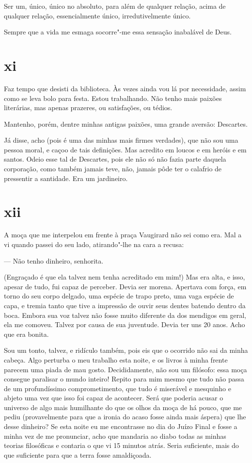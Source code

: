 Ser um, único, único no absoluto, para além de qualquer relação, acima
de qualquer relação, essencialmente único, irredutivelmente único.

Sempre que a vida me esmaga socorre"-me essa sensação inabalável de Deus.

\section{xi}

Faz tempo que desisti da biblioteca. Às vezes ainda vou lá por
necessidade, assim como se leva bolo para festa. Estou trabalhando. Não
tenho mais paixões literárias, mas apenas prazeres, ou satisfações, ou
tédios.

Mantenho, porém, dentre minhas antigas paixões, uma grande aversão:
Descartes.

Já disse, acho (pois é uma das minhas mais firmes verdades), que não
sou uma pessoa moral, e caçoo de tais definições. Mas acredito em loucos
e em heróis e em santos. Odeio esse tal de Descartes, pois ele não só
não fazia parte daquela corporação, como também jamais teve, não, jamais
pôde ter o calafrio de pressentir a santidade. Era um jardineiro.

\section{xii}

A moça que me interpelou em frente à praça Vaugirard não sei como era.
Mal a vi quando passei do seu lado, atirando"-lhe na cara a recusa:

--- Não tenho dinheiro, senhorita.

(Engraçado é que ela talvez nem tenha acreditado em mim!) Mas era alta,
e isso, apesar de tudo, fui capaz de perceber. Devia ser morena.
Apertava com força, em torno do seu corpo delgado, uma espécie de trapo
preto, uma vaga espécie de capa, e tremia tanto que tive a impressão de
ouvir seus dentes batendo dentro da boca. Embora sua voz talvez não
fosse muito diferente da dos mendigos em geral, ela me comoveu. Talvez
por causa de sua juventude. Devia ter uns 20 anos. Acho que era bonita.

Sou um tonto, talvez, e ridículo também, pois eis que o ocorrido não sai
da minha cabeça. Algo perturba o meu trabalho esta noite, e os livros à
minha frente parecem uma piada de mau gosto. Decididamente, não sou um
filósofo: essa moça consegue paralisar o mundo inteiro! Repito para mim
mesmo que tudo não passa de um profundíssimo comprometimento, que tudo é
miserável e mesquinho e abjeto uma vez que isso foi capaz de acontecer.
Será que poderia acusar o universo de algo mais humilhante do que os
olhos da moça de há pouco, que me pediu (provavelmente para que a ironia
do acaso fosse ainda mais áspera) que lhe desse dinheiro? Se esta
noite eu me encontrasse no dia do Juízo Final e fosse a minha vez de me
pronunciar, acho que mandaria ao diabo todas as minhas teorias
filosóficas e contaria o que vi 15 minutos atrás. Seria suficiente,
mais do que suficiente para que a terra fosse amaldiçoada.

